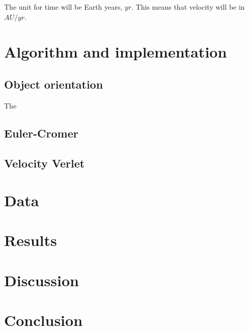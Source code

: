 \documentclass[10pt, a4paper]{amsart}
\begin{document}
The unit for time will be Earth years, $yr$. This means that velocity will be in $AU/yr$.

\section{Algorithm and implementation}

\subsection{Object orientation}
The 

\subsection{Euler-Cromer}

\subsection{Velocity Verlet}

\section{Data}

\section{Results}

\section{Discussion}

\section{Conclusion}
\end{document}
